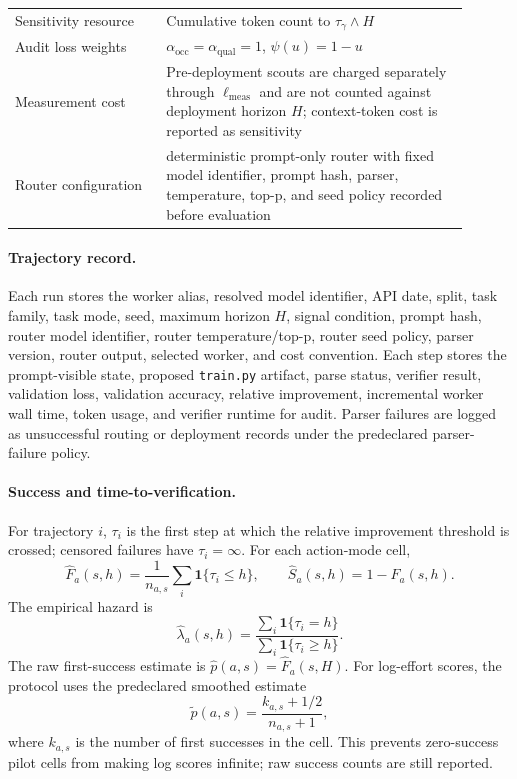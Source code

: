 \documentclass{article}
\newcommand{\one}{\mathbf{1}}
\begin{document}
\begin{table}[t]
\begin{tabular}{@{}p{0.30\linewidth}p{0.60\linewidth}@{}}
Sensitivity resource & Cumulative token count to \(\tau_\gamma\wedge H\) \\
Audit loss weights & $\alpha_{\mathrm{occ}}=\alpha_{\mathrm{qual}}=1$, $\psi(u)=1-u$ \\
Measurement cost & Pre-deployment scouts are charged separately through \(\ell_{\mathrm{meas}}\) and are not counted against deployment horizon \(H\); context-token cost is reported as sensitivity \\
Router configuration & deterministic prompt-only router with fixed model identifier, prompt hash, parser, temperature, top-p, and seed policy recorded before evaluation \\
\bottomrule
\end{tabular}
\end{table}

\paragraph{Trajectory record.}
Each run stores the worker alias, resolved model identifier, API date, split, task family, task mode, seed, maximum horizon $H$, signal condition, prompt hash, router model identifier, router temperature/top-p, router seed policy, parser version, router output, selected worker, and cost convention.
Each step stores the prompt-visible state, proposed \texttt{train.py} artifact, parse status, verifier result, validation loss, validation accuracy, relative improvement, incremental worker wall time, token usage, and verifier runtime for audit.
Parser failures are logged as unsuccessful routing or deployment records under the predeclared parser-failure policy.

\paragraph{Success and time-to-verification.}
For trajectory $i$, $\tau_i$ is the first step at which the relative improvement threshold is crossed; censored failures have $\tau_i=\infty$.
For each action-mode cell,
\[
  \hat F_a(s,h)=\frac{1}{n_{a,s}}\sum_i\one\{\tau_i\le h\},
  \qquad
  \hat S_a(s,h)=1-\hat F_a(s,h).
\]
The empirical hazard is
\[
  \hat\lambda_a(s,h)=
  \frac{\sum_i\one\{\tau_i=h\}}
       {\sum_i\one\{\tau_i\ge h\}} .
\]
The raw first-success estimate is $\hat p(a,s)=\hat F_a(s,H)$.
For log-effort scores, the protocol uses the predeclared smoothed estimate
\[
\tilde p(a,s)=\frac{k_{a,s}+1/2}{n_{a,s}+1},
\]
where $k_{a,s}$ is the number of first successes in the cell.
This prevents zero-success pilot cells from making log scores infinite; raw success counts are still reported.
\end{document}
